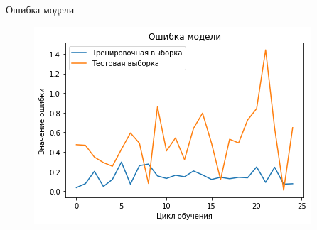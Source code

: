 \begin{frame}{Ошибка модели}
	\begin{figure}
        \includegraphics[width=\textwidth]{img/error_cnn.png}
    \end{figure}
\end{frame}
